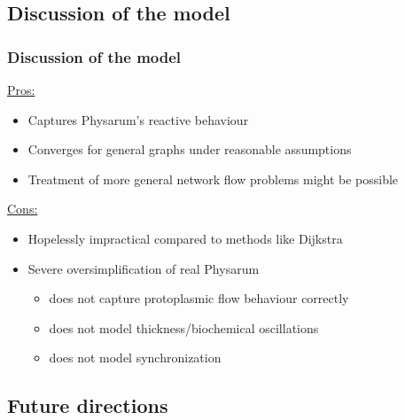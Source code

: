 \documentclass[	hyperref={pdfpagelabels=false}, xcolor=dvipsnames,
		11pt]{beamer}
\begin{document}

\subsection{Discussion of the model}

\begin{frame}
    \frametitle{Discussion of the model } 


	\begin{alertblock}{\underline{Pros:}}
	 \begin{itemize}
	  \item Captures Physarum's reactive behaviour
	  \item Converges for general graphs under reasonable assumptions
	  \item Treatment of more general network flow problems might be possible
	 \end{itemize}
	\end{alertblock}


	\begin{alertblock}{\underline{Cons:}}
	 \begin{itemize}
	  \item Hopelessly impractical compared to methods like Dijkstra
	  \item Severe oversimplification of real Physarum
	      \begin{itemize}
	       \item does not capture protoplasmic flow behaviour correctly
	       \item does not model thickness/biochemical oscillations
	       \item does not model synchronization
		
	      \end{itemize}

	 \end{itemize}
	\end{alertblock}


\end{frame}


\subsection{Future directions}
\end{document}
